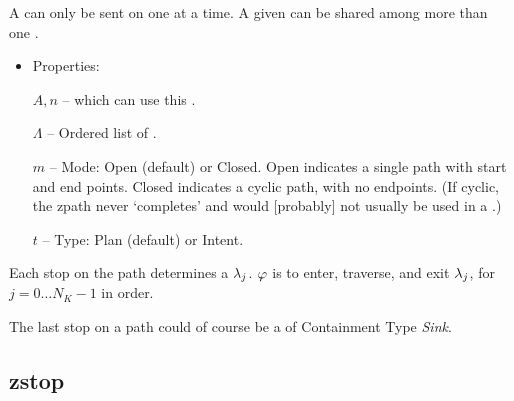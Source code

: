 A  can only be sent on one  at a time.
A given  can be shared among more than one .

\begin{itemize}
\item Properties:

  $A,n$ --  which can use this .
  
  ${\Lambda}$ -- Ordered list of .
  
  $m$ -- Mode: Open (default) or Closed.
  Open indicates a single path with start and end points. Closed indicates a cyclic path, with no endpoints.
  (If cyclic, the zpath never `completes' and would [probably] not usually be used in a .)

  $t$ -- Type: Plan (default) or Intent.
  
\end{itemize}
Each stop on the path determines a  ${\lambda}_j$.
${\varphi}$ is to enter, traverse, and exit ${\lambda}_j$, for $j=0\dots N_K-1$ in order.

The last stop on a path could of course be a  of Containment Type \emph{Sink}.

\subsection{zstop}

